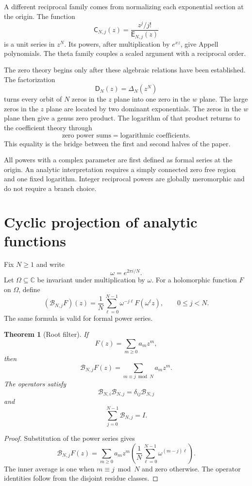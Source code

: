 \documentclass{aomart}
\newtheorem{theorem}{Theorem}[section]
\theoremstyle{definition}
\theoremstyle{remark}
\newcommand{\CC}{\mathbb C}
\newcommand{\Bcal}{\mathcal B}
\newcommand{\Dfun}{\mathsf D}
\newcommand{\Efun}{\mathsf E}
\newcommand{\Cfun}{\mathsf C}
\begin{document}
A different reciprocal family comes from normalizing each exponential section at the origin.  The function
\[
\Cfun_{N,j}(z)
=
\frac{z^j/j!}{\Efun_{N,j}(z)}
\]
is a unit series in $z^N$.  Its powers, after multiplication by $e^{xz}$, give Appell polynomials.  The theta family couples a scaled argument with a reciprocal order.

The zero theory begins only after these algebraic relations have been established.  The factorization
\[
\Dfun_N(z)=\Delta_N(z^N)
\]
turns every orbit of $N$ zeros in the $z$ plane into one zero in the $w$ plane.  The large zeros in the $z$ plane are located by two dominant exponentials.  The zeros in the $w$ plane then give a genus zero product.  The logarithm of that product returns to the coefficient theory through
\[
\text{zero power sums}
=
\text{logarithmic coefficients}.
\]
This equality is the bridge between the first and second halves of the paper.

All powers with a complex parameter are first defined as formal series at the origin.  An analytic interpretation requires a simply connected zero free region and one fixed logarithm.  Integer reciprocal powers are globally meromorphic and do not require a branch choice.

\section{Cyclic projection of analytic functions}\label{sec:cyclic_projection}

Fix $N\geq1$ and write
\[
\omega=e^{2\pi i/N}.
\]
Let $\Omega\subseteq\CC$ be invariant under multiplication by $\omega$.  For a holomorphic function $F$ on $\Omega$, define
\[
(\Bcal_{N,j}F)(z)
=
\frac1N\sum_{\ell=0}^{N-1}\omega^{-j\ell}F(\omega^\ell z),
\qquad 0\leq j<N.
\]
The same formula is valid for formal power series.

\begin{theorem}[Root filter]\label{thm:root_filter}
If
\[
F(z)=\sum_{m\geq0}a_mz^m,
\]
then
\[
\Bcal_{N,j}F(z)
=
\sum_{m\equiv j\bmod N}a_mz^m.
\]
The operators satisfy
\[
\Bcal_{N,i}\Bcal_{N,j}=\delta_{ij}\Bcal_{N,j}
\]
and
\[
\sum_{j=0}^{N-1}\Bcal_{N,j}=I.
\]
\end{theorem}

\begin{proof}
Substitution of the power series gives
\[
\Bcal_{N,j}F(z)
=
\sum_{m\geq0}a_mz^m
\left(
\frac1N\sum_{\ell=0}^{N-1}\omega^{(m-j)\ell}
\right).
\]
The inner average is one when $m\equiv j\bmod N$ and zero otherwise.  The operator identities follow from the disjoint residue classes.
\end{proof}
\end{document}
